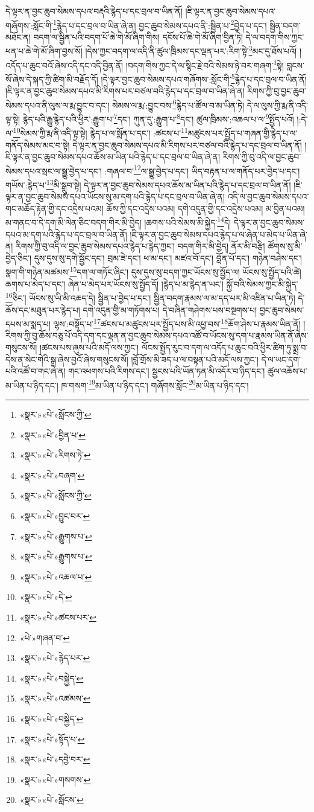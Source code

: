 དེ་ལྟར་ན་བྱང་ཆུབ་སེམས་དཔའ་བརྡའི་རྙེད་པ་དང་བྲལ་བ་ཡིན་ནོ། །ཇི་ལྟར་ན་བྱང་ཆུབ་སེམས་དཔའ་གཞོགས་:སློང་གི་\footnote{«སྣར་»«པེ་»སློངས་ཀྱི་}རྙེད་པ་དང་བྲལ་བ་ཡིན་ཞེ་ན། བྱང་ཆུབ་སེམས་དཔའ་ནི་:སྦྱིན་པ་\footnote{«སྣར་»«པེ་»བྱིན་པ་}བྱེད་པ་དང་། སྦྱིན་བདག་མཐོང་ན། བདག་ལ་སྦྱིན་པའི་བདག་པོ་ཆེ་གེ་མོ་ཞིག་གིས། དངོས་པོ་ཆེ་གེ་མོ་ཞིག་བྱིན་ཏེ། དེ་ལ་བདག་གིས་ཀྱང་ཕན་པ་ཆེ་གེ་མོ་ཞིག་བྱས་སོ། །དེས་ཀྱང་བདག་ལ་འདི་ནི་ཚུལ་ཁྲིམས་དང་ལྡན་པར་:རིག་སྟེ་\footnote{«སྣར་»«པེ་»རིགས་ཏེ་}མང་དུ་ཐོས་པའོ། །འདོད་པ་ཆུང་བའོ་ཞེས་འདི་དང་འདི་བྱིན་ནོ། །བདག་གིས་ཀྱང་དེ་ལ་སྙིང་རྗེ་བའི་སེམས་ཉེ་བར་གཞག་\footnote{«སྣར་»«པེ་»བཞག་}སྟེ། བླངས་སོ་ཞེས་དེ་སྐད་ཀྱི་ཚིག་མི་བརྗོད་དོ། །དེ་ལྟར་བྱང་ཆུབ་སེམས་དཔའ་གཞོགས་:སློང་གི་\footnote{«སྣར་»«པེ་»སློངས་ཀྱི་}རྙེད་པ་དང་བྲལ་བ་ཡིན་ནོ། །ཇི་ལྟར་ན་བྱང་ཆུབ་སེམས་དཔའ་མི་རིགས་པར་བཙལ་བའི་རྙེད་པ་དང་བྲལ་བ་ཡིན་ཞེ་ན། རིགས་ཀྱི་བུ་བྱང་ཆུབ་སེམས་དཔའ་ནི་ལུས་ལ་རྨ་བྱུང་བ་དང་། སེམས་ལ་རྨ་:བྱུང་བས་\footnote{«སྣར་»«པེ་»བྱུང་བར་}རྙེད་པ་ཚོལ་བ་མ་ཡིན་ཏེ། དེ་ལ་ལུས་ཀྱི་རྨ་ནི་འདི་ལྟ་སྟེ། རྙེད་པའི་རྒྱུ་རྙེད་པའི་ཕྱིར་:རྒྱུག་པ་\footnote{«སྣར་»«པེ་»རྒྱུགས་པ་}དང་། ཀུན་དུ་:རྒྱུག་པ་\footnote{«སྣར་»«པེ་»རྒྱུགས་པ་}དང་། ཚུལ་ཁྲིམས་:འཆལ་པ་ལ་\footnote{«སྣར་»«པེ་»འཆལ་པ་}སྤྱོད་པའོ། །:དེ་ལ་\footnote{«སྣར་»«པེ་»དེ་}སེམས་ཀྱི་རྨ་ནི་འདི་ལྟ་སྟེ། རྙེད་པ་ལ་སྨོན་པ་དང་། :ཚངས་པ་\footnote{«སྣར་»«པེ་»ཚངས་པར་}མཚུངས་པར་སྤྱོད་པ་གཞན་གྱི་རྙེད་པ་ལ་གནོད་སེམས་མང་བ་སྟེ། དེ་ལྟར་ན་བྱང་ཆུབ་སེམས་དཔའ་མི་རིགས་པར་བཙལ་བའི་རྙེད་པ་དང་བྲལ་བ་ཡིན་ནོ། །ཇི་ལྟར་ན་བྱང་ཆུབ་སེམས་དཔའ་ཆོས་མ་ཡིན་པའི་རྙེད་པ་དང་བྲལ་བ་ཡིན་ཞེ་ན། རིགས་ཀྱི་བུ་འདི་ལ་བྱང་ཆུབ་སེམས་དཔའ་སྲང་ལ་སྒྱུ་བྱེད་པ་དང་། :གཞལ་བ་\footnote{«པེ་»གཞན་བ་}ལ་སྒྱུ་བྱེད་པ་དང་། ཡིད་བརྟན་པ་ལ་གནོད་པར་བྱེད་པ་དང་། གཡོས་:རྙེད་པ་\footnote{«སྣར་»«པེ་»རྙེད་པར་}མི་སྒྲུབ་སྟེ། དེ་ལྟར་ན་བྱང་ཆུབ་སེམས་དཔའ་ཆོས་མ་ཡིན་པའི་རྙེད་པ་དང་བྲལ་བ་ཡིན་ནོ། །ཇི་ལྟར་ན་བྱང་ཆུབ་སེམས་དཔའ་ཡོངས་སུ་མ་དག་པའི་རྙེད་པ་དང་བྲལ་བ་ཡིན་ཞེ་ན། འདི་ལ་བྱང་ཆུབ་སེམས་དཔའ་གང་མཆོད་རྟེན་གྱི་དང་འདྲེས་པའམ། ཆོས་ཀྱི་དང་འདྲེས་པའམ། དགེ་འདུན་གྱི་དང་འདྲེས་པའམ། མ་བྱིན་པའམ། མ་གནང་བ་དེ་དག་མི་ལེན་ཅིང་བདག་གིར་མི་བྱེད། །ཆགས་པའི་སེམས་མི་སྐྱེད་\footnote{«སྣར་»«པེ་»བསྐྱེད་}དེ། དེ་ལྟར་ན་བྱང་ཆུབ་སེམས་དཔའ་མ་དག་པའི་རྙེད་པ་དང་བྲལ་བ་ཡིན་ནོ། །ཇི་ལྟར་ན་བྱང་ཆུབ་སེམས་དཔའ་རྙེད་པ་ལ་ཞེན་པ་མེད་པ་ཡིན་ཞེ་ན། རིགས་ཀྱི་བུ་འདི་ལ་བྱང་ཆུབ་སེམས་དཔའ་རྙེད་པ་རྙེད་ཀྱང་། བདག་གིར་མི་བྱེད། ནོར་མི་བརྩི། ཚོགས་སུ་མི་བྱེད་ཅིང་། དུས་དུས་སུ་དགེ་སྦྱོང་དང་། བྲམ་ཟེ་དང་། ཕ་མ་དང་། མཛའ་བོ་དང་། བློན་པོ་དང་། གཉེན་བཤེས་དང་། སྣག་གི་གཉེན་མཚམས་\footnote{«སྣར་»«པེ་»འཚམས་}དག་ལ་གཏོང་ཞིང་། དུས་དུས་སུ་བདག་ཀྱང་ཡོངས་སུ་སྤྱོད་ལ། ཡོངས་སུ་སྤྱོད་པའི་ཚེ། ཆགས་པ་མེད་པ་དང་། ཞེན་པ་མེད་པར་ཡོངས་སུ་སྤྱོད་དོ། །རྙེད་པ་མ་རྙེད་ན་ཡང་། སྐྱོ་བའི་སེམས་ཀྱང་མི་སྐྱེད་\footnote{«སྣར་»«པེ་»བསྐྱེད་}ཅིང་། ཡོངས་སུ་ཡི་མི་འཆད་དེ། སྦྱིན་པ་བྱེད་པ་དང་། སྦྱིན་བདག་རྣམས་ལ་མ་དད་པར་མི་འཛིན་པ་ཡིན་ཏེ། དེ་ཆོས་དང་མཐུན་པར་རྙེད་པ། དགེ་འདུན་གྱི་མ་གཏོགས་པ། དེ་བཞིན་གཤེགས་པས་བསྔགས་པ། བྱང་ཆུབ་སེམས་དཔས་མ་སྨད་པ། ལྷས་:བསྟོད་པ་\footnote{«སྣར་»«པེ་»སྟོད་པ་}ཚངས་པ་མཚུངས་པར་སྤྱོད་པས་མི་འཕྱ་བས་\footnote{«སྣར་»«པེ་»དབྱེ་བར་}ཆོག་ཤེས་པ་རྣམས་ཡིན་ནོ། །རིགས་ཀྱི་བུ་ཆོས་བཅུ་པོ་འདི་དག་དང་ལྡན་ན་བྱང་ཆུབ་སེམས་དཔའ་འཚོ་བ་ཡོངས་སུ་དག་པ་རྣམས་ཡིན་ནོ་ཞེས་གསུངས་སོ། །ཚངས་པས་ཞུས་པའི་མདོ་ལས་ཀྱང་། ལོངས་སྤྱོད་རུང་བ་དག་ལ་འདོད་པ་ཆུང་བའི་ཕྱིར་ཚིག་ཏུ་སྨྲ་བ་དེས་ན་སེང་གེའི་སྒྲ་ཞེས་བྱའོ་ཞེས་གསུངས་སོ། །བློ་གྲོས་མི་ཟད་པ་ལ་བསྟན་པའི་མདོ་ལས་ཀྱང་། དེ་ལ་ཡང་དག་པའི་འཚོ་བ་གང་ཞེ་ན། གང་འཕགས་པའི་རིགས་དང་། སྦྱངས་པའི་ཡོན་ཏན་མི་འདོར་བ་ཉིད་དང་། ཚུལ་འཆོས་པ་མ་ཡིན་པ་ཉིད་དང་། ཁ་གསག་\footnote{«སྣར་»«པེ་»གསགས་}མ་ཡིན་པ་ཉིད་དང་། གཞོགས་སློང་\footnote{«སྣར་»«པེ་»སློངས་}མ་ཡིན་པ་ཉིད་དང་། 